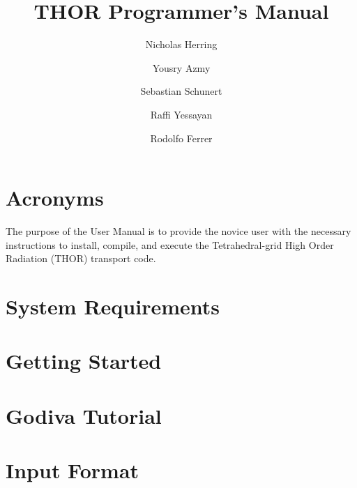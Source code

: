 \documentclass[twoside]{report}
\title{THOR Programmer's Manual}
\author[1]{Nicholas Herring}
\author[1]{Yousry Azmy}
\author[2]{Sebastian Schunert}
\author[3]{Raffi Yessayan}
\author[4]{Rodolfo Ferrer}
\affil[1]{North Carolina State University}
\affil[2]{Idaho National Laboratory}
\affil[3]{Los Alamos National Laboratory}
\affil[4]{Studsvik Scandpower}
\begin{document}



%

\chapter*{Acronyms}


\tableofcontents


\clearpage
{}
\pagestyle{fancy}

The purpose of the User Manual is to provide the novice user with the necessary instructions to install, compile, and execute the Tetrahedral-grid High Order Radiation (THOR) transport code.

\chapter{System Requirements}



\chapter{Getting Started}



\chapter{Godiva Tutorial}



\chapter{Input Format}







\end{document}
